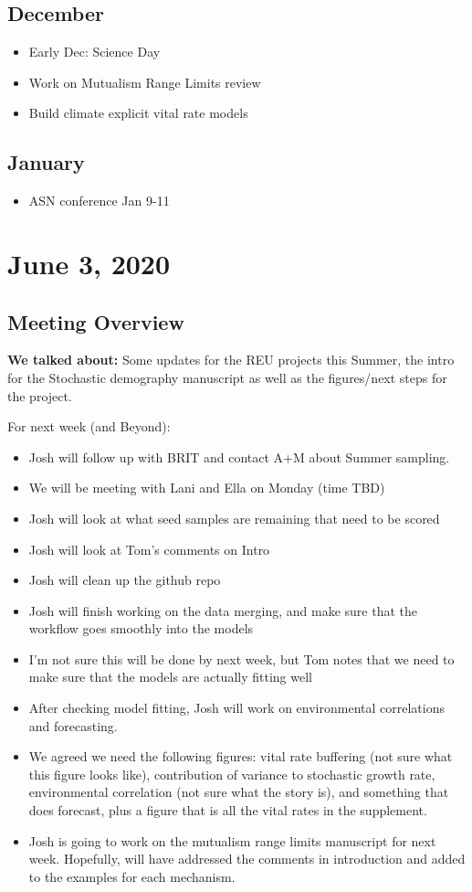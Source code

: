 \documentclass{article}
\begin{document}
\subsection*{December}
\begin{itemize}
\item{Early Dec: Science Day}
\item{Work on Mutualism Range Limits review}
\item{Build climate explicit vital rate models}
\end{itemize}
\subsection*{January}
\begin{itemize}
\item{ASN conference Jan 9-11}
\end{itemize}



\section*{June 3, 2020}
\subsection*{Meeting Overview}
\textbf{We talked about:}
Some updates for the REU projects this Summer, the intro for the Stochastic demography manuscript as well as the figures/next steps for the project.

For next week (and Beyond):
\begin{itemize}
\item{Josh will follow up with BRIT and contact A+M about Summer sampling.}
\item{We will be meeting with Lani and Ella on Monday (time TBD)}
\item{Josh will look at what seed samples are remaining that need to be scored}
\item{Josh will look at Tom's comments on Intro}
\item{Josh will clean up the github repo}
\item{Josh will finish working on the data merging, and make sure that the workflow goes smoothly into the models}
\item{I'm not sure this will be done by next week, but Tom notes that we need to make sure that the models are actually fitting well}
\item{After checking model fitting, Josh will work on environmental correlations and forecasting.}
\item{We agreed we need the following figures: vital rate buffering (not sure what this figure looks like), contribution of variance to stochastic growth rate, environmental correlation (not sure what the story is), and something that does forecast, plus a figure that is all the vital rates in the supplement.}
\item{Josh is going to work on the mutualism range limits manuscript for next week. Hopefully, will have addressed the comments in introduction and added to the examples for each mechanism.}
\end{itemize}
\end{document}

